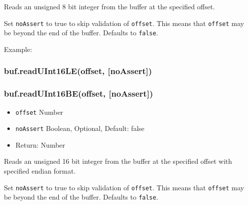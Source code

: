 Reads an unsigned 8 bit integer from the buffer at the specified offset.

Set \texttt{noAssert} to true to skip validation of \texttt{offset}.
This means that \texttt{offset} may be beyond the end of the buffer.
Defaults to \texttt{false}.

Example:

\begin{Shaded}
\begin{Highlighting}[]
  \NormalTok{);}

\NormalTok{buf[}\NormalTok{] = }\NormalTok{;}
\NormalTok{buf[}\NormalTok{] = }\NormalTok{;}
\NormalTok{buf[}\NormalTok{] = }\NormalTok{;}
\NormalTok{buf[}\NormalTok{] = }\NormalTok{;}

 
  \NormalTok{(}
\NormalTok{\}}

\end{Highlighting}
\end{Shaded}

\subsubsection{buf.readUInt16LE(offset, {[}noAssert{]})}

\subsubsection{buf.readUInt16BE(offset, {[}noAssert{]})}

\begin{itemize}
\item
  \texttt{offset} Number
\item
  \texttt{noAssert} Boolean, Optional, Default: false
\item
  Return: Number
\end{itemize}

Reads an unsigned 16 bit integer from the buffer at the specified offset
with specified endian format.

Set \texttt{noAssert} to true to skip validation of \texttt{offset}.
This means that \texttt{offset} may be beyond the end of the buffer.
Defaults to \texttt{false}.

